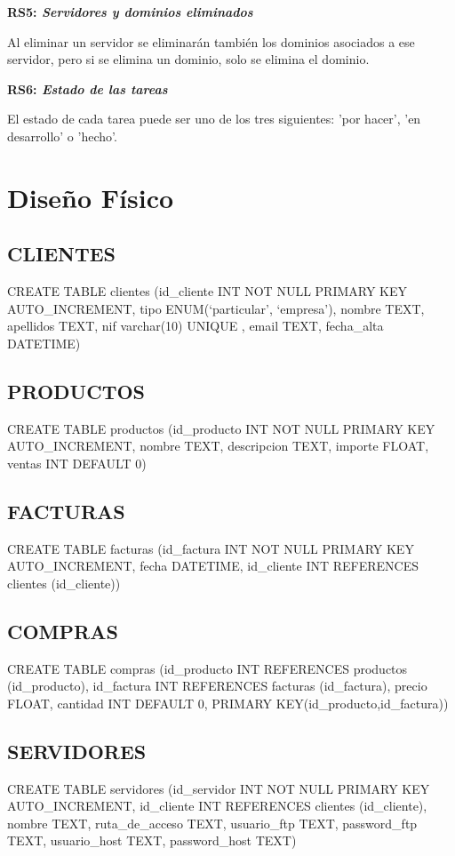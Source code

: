 \documentclass[paper=a4, fontsize=11pt, spanish]{scrartcl}
\begin{document}
\setlength{\parindent}{0em}
\textbf{RS5: \textit{Servidores y dominios eliminados}}
\setlength{\parindent}{2em}

Al eliminar un servidor se eliminarán también los dominios asociados a ese servidor, pero si se elimina un dominio, solo se elimina el dominio.

\setlength{\parindent}{0em}
\textbf{RS6: \textit{Estado de las tareas}}
\setlength{\parindent}{2em}

El estado de cada tarea puede ser uno de los tres siguientes: 'por hacer', 'en desarrollo' o 'hecho'.

\section{Diseño Físico}
\subsection{CLIENTES}
CREATE TABLE clientes (id\_cliente INT NOT NULL PRIMARY KEY AUTO\_INCREMENT, tipo ENUM(‘particular’, ‘empresa’),  nombre TEXT,  apellidos TEXT, nif varchar(10) UNIQUE , email TEXT, fecha\_alta DATETIME)

\subsection{PRODUCTOS}
CREATE TABLE productos (id\_producto INT NOT NULL PRIMARY KEY AUTO\_INCREMENT, nombre TEXT,  descripcion TEXT,  importe FLOAT, ventas INT DEFAULT 0)

\subsection{FACTURAS}
CREATE TABLE facturas (id\_factura INT NOT NULL PRIMARY KEY AUTO\_INCREMENT, fecha DATETIME, id\_cliente INT REFERENCES clientes (id\_cliente))

\subsection{COMPRAS}
CREATE TABLE compras (id\_producto INT REFERENCES productos (id\_producto), id\_factura INT REFERENCES facturas (id\_factura), precio FLOAT, cantidad INT DEFAULT 0, PRIMARY KEY(id\_producto,id\_factura))

\subsection{SERVIDORES}
CREATE TABLE servidores (id\_servidor INT NOT NULL PRIMARY KEY AUTO\_INCREMENT, id\_cliente INT REFERENCES clientes (id\_cliente), nombre TEXT,  ruta\_de\_acceso TEXT, usuario\_ftp TEXT, password\_ftp TEXT, usuario\_host TEXT, password\_host TEXT)
\end{document}
